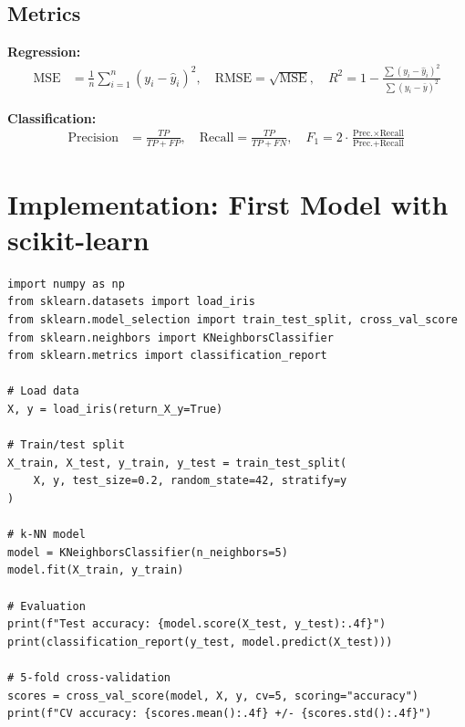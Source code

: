 \subsection{Metrics}

\begin{keyformulas}[title=\textbf{Common metrics}]
\textbf{Regression:}
\begin{align}
  \text{MSE} &= \frac{1}{n}\sum_{i=1}^n (y_i - \hat{y}_i)^2, \quad
  \text{RMSE} = \sqrt{\text{MSE}}, \quad
  R^2 = 1 - \frac{\sum(y_i-\hat{y}_i)^2}{\sum(y_i - \bar{y})^2}
\end{align}

\textbf{Classification:}
\begin{align}
  \text{Precision} &= \frac{TP}{TP + FP}, \quad
  \text{Recall} = \frac{TP}{TP + FN}, \quad
  F_1 = 2 \cdot \frac{\text{Prec.} \times \text{Recall}}{\text{Prec.} + \text{Recall}}
\end{align}
\end{keyformulas}

\section{Implementation: First Model with scikit-learn}
\label{sec:first-model}

\begin{codeblock}[title=\textbf{Iris classification with scikit-learn}]
\begin{verbatim}
import numpy as np
from sklearn.datasets import load_iris
from sklearn.model_selection import train_test_split, cross_val_score
from sklearn.neighbors import KNeighborsClassifier
from sklearn.metrics import classification_report

# Load data
X, y = load_iris(return_X_y=True)

# Train/test split
X_train, X_test, y_train, y_test = train_test_split(
    X, y, test_size=0.2, random_state=42, stratify=y
)

# k-NN model
model = KNeighborsClassifier(n_neighbors=5)
model.fit(X_train, y_train)

# Evaluation
print(f"Test accuracy: {model.score(X_test, y_test):.4f}")
print(classification_report(y_test, model.predict(X_test)))

# 5-fold cross-validation
scores = cross_val_score(model, X, y, cv=5, scoring="accuracy")
print(f"CV accuracy: {scores.mean():.4f} +/- {scores.std():.4f}")
\end{verbatim}
\end{codeblock}

